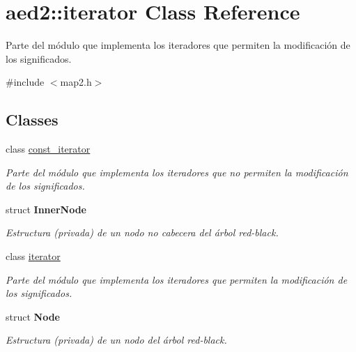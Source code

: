 \hypertarget{classaed2_1_1iterator}{\section{aed2\-:\-:iterator \-Class \-Reference}
\label{classaed2_1_1iterator}
}


\-Parte del módulo que implementa los iteradores que permiten la modificación de los significados.  




{\ttfamily \#include $<$map2.\-h$>$}

\subsection*{\-Classes}
\begin{DoxyCompactItemize}
\item 
class \hyperlink{classaed2_1_1iterator_1_1const__iterator}{const\-\_\-iterator}
\begin{DoxyCompactList}\small\item\em \-Parte del módulo que implementa los iteradores que no permiten la modificación de los significados. \end{DoxyCompactList}\item 
struct {\bfseries \-Inner\-Node}
\begin{DoxyCompactList}\small\item\em \-Estructura (privada) de un nodo no cabecera del árbol red-\/black. \end{DoxyCompactList}\item 
class \hyperlink{classaed2_1_1iterator_1_1iterator}{iterator}
\begin{DoxyCompactList}\small\item\em \-Parte del módulo que implementa los iteradores que permiten la modificación de los significados. \end{DoxyCompactList}\item 
struct {\bfseries \-Node}
\begin{DoxyCompactList}\small\item\em \-Estructura (privada) de un nodo del árbol red-\/black. \end{DoxyCompactList}\end{DoxyCompactItemize}
